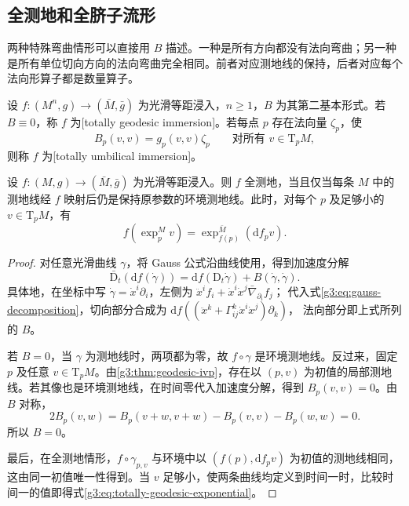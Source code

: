 \subsection{全测地和全脐子流形}
\label{g3:subsec:0401:04}

两种特殊弯曲情形可以直接用 \(B\) 描述。一种是所有方向都没有法向弯曲；另一种是所有单位切向方向的法向弯曲完全相同。前者对应测地线的保持，后者对应每个法向形算子都是数量算子。

\begin{definition}\label{g3:def:totally-geodesic-umbilical}
	设 \(f:(M^n,g)\to(\bar M,\bar g)\) 为光滑等距浸入，\(n\ge1\)，\(B\) 为其第二基本形式。若 \(B\equiv0\)，称 \(f\) 为[totally geodesic immersion]。若每点 \(p\) 存在法向量 \(\zeta_p\)，使
	\[
		B_p(v,v)=g_p(v,v)\zeta_p\qquad
		\text{对所有 }v\in\mathrm{T}_pM,
	\]
	则称 \(f\) 为[totally umbilical immersion]。
\end{definition}

\begin{proposition}\label{g3:prop:totally-geodesic-characterization}
	设 \(f:(M,g)\to(\bar M,\bar g)\) 为光滑等距浸入。则 \(f\) 全测地，当且仅当每条 \(M\) 中的测地线经 \(f\) 映射后仍是保持原参数的环境测地线。此时，对每个 \(p\) 及足够小的 \(v\in\mathrm{T}_pM\)，有
	\begin{equation}\label{g3:eq:totally-geodesic-exponential}
		f(\exp_p^M v)=\exp_{f(p)}^{\bar M}(\mathrm df_pv).
	\end{equation}
\end{proposition}
\begin{proof}
	对任意光滑曲线 \(\gamma\)，将 Gauss 公式沿曲线使用，得到加速度分解
	\begin{equation}\label{g3:eq:immersion-curve-acceleration}
		\bar{\mathrm D}_t(\mathrm df(\dot\gamma))
		=\mathrm df(\mathrm D_t\dot\gamma)+B(\dot\gamma,\dot\gamma).
	\end{equation}
	具体地，在坐标中写 \(\dot\gamma=\dot x^i\partial_i\)，左侧为
	\(\ddot x^i f_i+\dot x^i\dot x^j\bar\nabla_{\partial_i}f_j\)；
	代入式\eqref{g3:eq:gauss-decomposition}，切向部分合成为
	\(\mathrm df((\ddot x^k+\Gamma^k_{ij}\dot x^i\dot x^j)\partial_k)\)，
	法向部分即上式所列的 \(B\)。

	若 \(B=0\)，当 \(\gamma\) 为测地线时，两项都为零，故 \(f\circ\gamma\) 是环境测地线。反过来，固定 \(p\) 及任意 \(v\in\mathrm{T}_pM\)。由\cref{g3:thm:geodesic-ivp}，存在以 \((p,v)\) 为初值的局部测地线。若其像也是环境测地线，在时间零代入加速度分解，得到 \(B_p(v,v)=0\)。由 \(B\) 对称，
	\[
		2B_p(v,w)=B_p(v+w,v+w)-B_p(v,v)-B_p(w,w)=0.
	\]
	所以 \(B=0\)。

	最后，在全测地情形，\(f\circ\gamma_{p,v}\) 与环境中以
	\((f(p),\mathrm df_pv)\) 为初值的测地线相同，这由同一初值唯一性得到。当 \(v\) 足够小，使两条曲线均定义到时间一时，比较时间一的值即得式\eqref{g3:eq:totally-geodesic-exponential}。
\end{proof}

